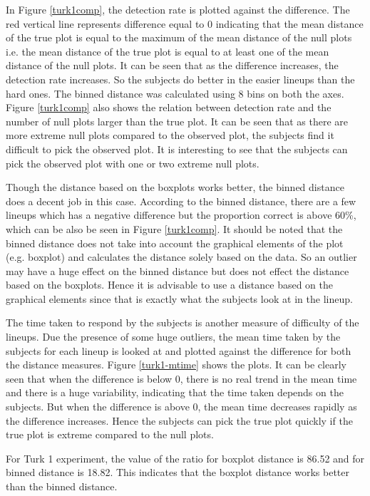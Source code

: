 \documentclass[12]{article}
\begin{document}
In Figure \ref{turk1comp}, the detection rate is plotted against the difference. The red vertical line represents difference equal to 0 indicating that the mean distance of the true plot is equal to the maximum of the mean distance of the null plots i.e. the mean distance of the true plot is equal to at least one of the mean distance of the null plots. It can be seen that as the difference increases, the detection rate increases. So the subjects do better in the easier lineups than the hard ones. The binned distance was calculated using 8 bins on both the axes. Figure \ref{turk1comp} also shows the relation between detection rate and the number of null plots larger than the true plot. It can be seen that as there are more extreme null plots compared to the observed plot, the subjects find it difficult to pick the observed plot. It is interesting to see that the subjects can pick the observed plot with one or two extreme null plots. 

Though the distance based on the boxplots works better, the binned distance does a decent job in this case. According to the binned distance, there are a few lineups which has a negative difference but the proportion correct is above 60\%, which can be also be seen in Figure \ref{turk1comp}. It should be noted that the binned distance does not take into account the graphical elements of the plot (e.g. boxplot) and calculates the distance solely based on the data. So an outlier may have a huge effect on the binned distance but does not effect the distance based on the boxplots. Hence it is advisable to use a distance based on the graphical elements since that is exactly what the subjects look at in the lineup.

The time taken to respond by the subjects is another measure of difficulty of the lineups. Due the presence of some huge outliers, the mean time taken by the subjects for each lineup is looked at and plotted against the difference for both the distance measures. Figure \ref{turk1-mtime} shows the plots. It can be clearly seen that when the difference is below 0, there is no real trend in the mean time and there is a huge variability, indicating that the time taken depends on the subjects. But when the difference is above 0, the mean time decreases rapidly as the difference increases. Hence the subjects can pick the true plot quickly if the true plot is extreme compared to the null plots.

For Turk 1 experiment, the value of the ratio for boxplot distance is 86.52 and for binned distance is 18.82. This indicates that the boxplot distance works better than the binned distance. 
 
\end{document}
